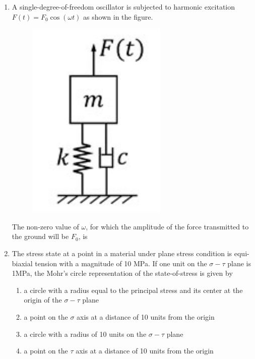 \documentclass[12pt,onecolumn]{article}
\begin{document}
\begin{enumerate}
    \item A single-degree-of-freedom oscillator is subjected to harmonic excitation $F(t) = F_0\cos(\omega t)$ as shown in the figure.
          \begin{figure}[H]
              \centering
              \includegraphics[scale=0.4]{q6}
              \label{fig:q6}
          \end{figure}
          The non-zero value of $\omega$, for which the amplitude of the force transmitted to the ground will be $F_0$, is
          \begin{enumerate}
          \end{enumerate}

    \item The stress state at a point in a material under plane stress condition is equi-biaxial tension with a magnitude of 10 MPa. If one unit on the $\sigma-\tau$ plane is 1MPa, the Mohr's circle representation of the state-of-stress is given by
          \begin{enumerate}
              \item a circle with a radius equal to the principal stress and its center at the origin of the $\sigma-\tau$ plane
              \item a point on the $\sigma$ axis at a distance of 10 units from the origin
              \item a circle with a radius of 10 units on the $\sigma-\tau$ plane
              \item a point on the $\tau$ axis at a distance of 10 units from the origin
          \end{enumerate}


\end{enumerate}
\end{document}

